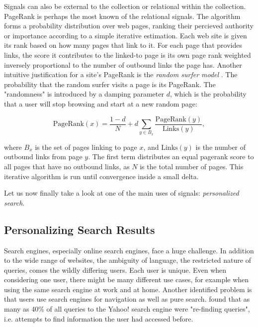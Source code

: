 Signals can also be external to the collection or relational within the collection.
PageRank \cite[p4]{Bender2005} is perhaps the most known of the relational signals.
The algorithm forms a probability distribution over web pages, ranking their percieved
authority or importance according to a simple iterative estimation.
Each web site is given its rank based on how many pages that link to it.
For each page that provides links, the score it contributes to the linked-to page is 
its own page rank weighted inversely proportional to the number of outbound links the page has.
Another intuitive justification for a site's PageRank is the \emph{random surfer model} \cite[p4]{Bender2005}.
The probability that the random surfer visits a page is its PageRank. The "randomness" is introduced 
by a damping parameter $d$, which is the probability that a user will stop browsing and start at a new random page:

\begin{equation*}
  \mathrm{PageRank}(x) = \frac{1 - d}{N} + d \sum_{y \in B_x} \frac{\mathrm{PageRank}(y)}{\mathrm{Links}(y)},
\end{equation*}

where $B_x$ is the set of pages linking to page $x$, and $\mathrm{Links}(y)$ is the number of outbound links from page $y$.
The first term distributes an equal pagerank score to all pages that have no outbound links, as $N$ is the total number of pages.
This iterative algorithm is run until convergence inside a small delta.

Let us now finally take a look at one of the main uses of signals: \emph{personalized search}.


\subsection{Personalizing Search Results}

Search engines, especially online search engines, face a huge challenge. 
In addition to the wide range of websites, the ambiguity of language,
the restricted nature of queries, comes the wildly differing users.
Each user is unique. Even when considering one user, there might be many 
different use cases, for example when using the same search engine at work and at home.
Another identified problem is that users use search engines for navigation as well as pure search.
\citet{Teevan2007} found that as many as 40\% of all queries to the Yahoo! search engine were "re-finding queries",
i.e. attempts to find information the user had accessed before.

